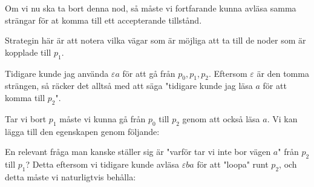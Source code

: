 \noindent Om vi nu ska ta bort denna nod, så måste vi fortfarande kunna avläsa samma strängar för at komma till ett accepterande tillstånd.\par
\noindent Strategin här är att notera vilka vägar som är möjliga att ta till de noder som är kopplade till $p_1$.
\par\bigskip
\noindent Tidigare kunde jag använda $\varepsilon a$ för att gå från $p_0,p_1,p_2$. Eftersom $\varepsilon$ är den tomma strängen, så räcker det alltså med att säga "tidigare kunde jag läsa $a$ för att komma till $p_2$".\par
\noindent Tar vi bort $p_1$ måste vi kunna gå från $p_0$ till $p_2$ genom att också läsa $a$. Vi kan lägga till den egenskapen genom följande:
\begin{figure}[ht!]
    \centering
    \caption{}
\end{figure}
\newpage
\noindent En relevant fråga man kanske ställer sig är "varför tar vi inte bor vägen $a$" från $p_2$ till $p_1$? Detta eftersom vi tidigare kunde avläsa $\varepsilon ba$ för att "loopa" runt $p_2$, och detta måste vi naturligtvis behålla:
